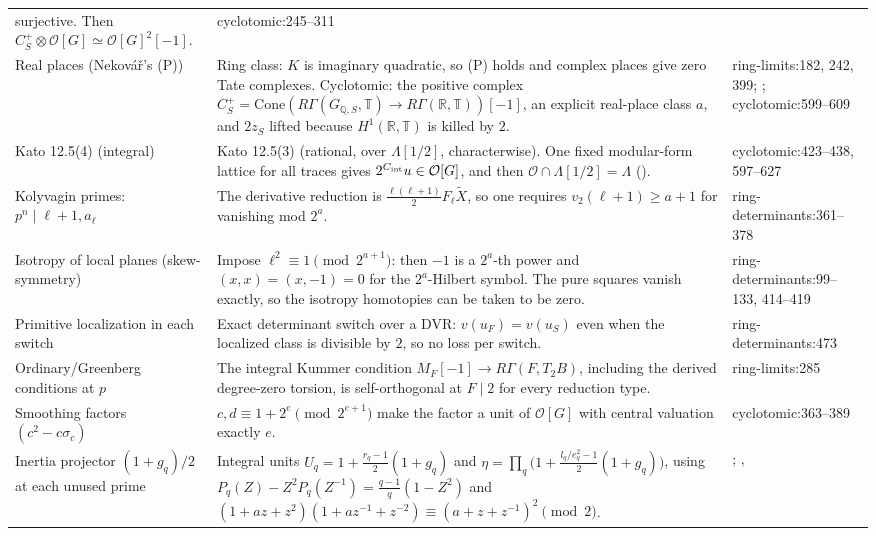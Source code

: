 \documentclass[11pt]{article}
\theoremstyle{remark}
\newcommand{\Q}{\mathbb Q}
\newcommand{\R}{\mathbb R}
\newcommand{\cO}{\mathcal O}
\newcommand{\src}[2]{\textsf{\small #1:#2}}
\begin{document}
{\begin{longtable}{@{}P{0.25\textwidth}P{0.49\textwidth}P{0.19\textwidth}@{}}
 surjective. Then $C^+_S\otimes\cO[G]\simeq\cO[G]^2[-1]$. &
  \src{cyclotomic}{245--311} \\
Real places (Nekov\'a\v{r}'s (P)) &
 Ring class: $K$ is imaginary quadratic, so (P) holds and complex places
 give zero Tate complexes. Cyclotomic: the positive complex
 $C^+_S=\mathrm{Cone}(R\Gamma(G_{\Q,S},\mathbb T)\to R\Gamma(\R,\mathbb T))[-1]$,
 an explicit real-place class $a$, and $2z_S$ lifted because
 $H^1(\R,\mathbb T)$ is killed by $2$. &
 \src{ring-limits}{182, 242, 399}; ; \src{cyclotomic}{599--609} \\
Kato 12.5(4) (integral) &
 Kato 12.5(3) (rational, over $\Lambda[1/2]$, characterwise). One fixed
 modular-form lattice for all traces gives $2^{C_{\rm int}}u\in\cO[G]$, and
 then $\cO\cap\Lambda[1/2]=\Lambda$ (). &
 \src{cyclotomic}{423--438, 597--627} \\
Kolyvagin primes: $p^n\mid\ell+1,a_\ell$ &
 The derivative reduction is $\frac{\ell(\ell+1)}2F_\ell\widetilde X$, so
 one requires $v_2(\ell+1)\ge a+1$ for vanishing mod $2^a$. &
 \src{ring-determinants}{361--378} \\
Isotropy of local planes (skew-symmetry) &
 Impose $\ell^2\equiv1\pmod{2^{a+1}}$: then $-1$ is a $2^a$-th power and
 $(x,x)=(x,-1)=0$ for the $2^a$-Hilbert symbol. The pure squares vanish
 exactly, so the isotropy homotopies can be taken to be zero. &
  \src{ring-determinants}{99--133, 414--419} \\
Primitive localization in each switch &
 Exact determinant switch over a DVR: $v(u_F)=v(u_S)$ even when the
 localized class is divisible by $2$, so no loss per switch. &
  \src{ring-determinants}{473} \\
Ordinary/Greenberg conditions at $p$ &
 The integral Kummer condition $M_F[-1]\to R\Gamma(F,T_2B)$, including the
 derived degree-zero torsion, is self-orthogonal at $F\mid2$ for every
 reduction type. &
  \src{ring-limits}{285} \\
Smoothing factors $(c^2-c\sigma_c)$ &
 $c,d\equiv1+2^e\pmod{2^{e+1}}$ make the factor a unit of $\cO[G]$ with
 central valuation exactly $e$. &
 \src{cyclotomic}{363--389} \\
Inertia projector $(1+g_q)/2$ at each unused prime &
 Integral units $U_q=1+\frac{r_q-1}2(1+g_q)$ and
 $\eta=\prod_q\bigl(1+\frac{l_q/e_q^2-1}{2}(1+g_q)\bigr)$, using
 $P_q(Z)-Z^2P_q(Z^{-1})=\frac{q-1}q(1-Z^2)$ and
 $(1+az+z^2)(1+az^{-1}+z^{-2})\equiv(a+z+z^{-1})^2\pmod2$. &
 ; ,  \\

\end{longtable}}
\end{document}
